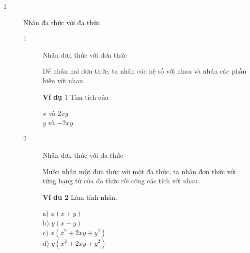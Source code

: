\newcommand{\hop}[1]{
    \begin{tcolorbox}
        [colback=cyan!15,colframe=orange!75!white]{#1}
    \end{tcolorbox}
}


    \begin{description}
        \item[I] Nhân đa thức với đa thức
        \begin{description}
            \item[1] Nhân đơn thức với đơn thức
            \hop{
                Để nhân hai đơn thức, ta nhân các hệ số với nhau và nhân các phần biến với nhau.
            }

            \textbf{Ví dụ $1$} Tìm tích của
            \begin{multicols}{2}
                $x$ và $2xy$\\
                $y$ và $-2xy$.
            \end{multicols}

            \item[2] Nhân đơn thức với đa thức
            \hop{
                Muốn nhân một đơn thức với một đa thức, ta nhân đơn thức với từng hạng tử của đa thức rồi cộng các tích với nhau.}
            \textbf{Ví du 2} Làm tính nhân.
            \begin{multicols}{2}
                \noindent a) $x(x+y)$\\
                b) $y(x-y)$\\
                c) $x(x^2+2xy+y^2)$\\
                d) $y(x^2+2xy+y^2)$
            \end{multicols}



\end{description}
\end{description}
